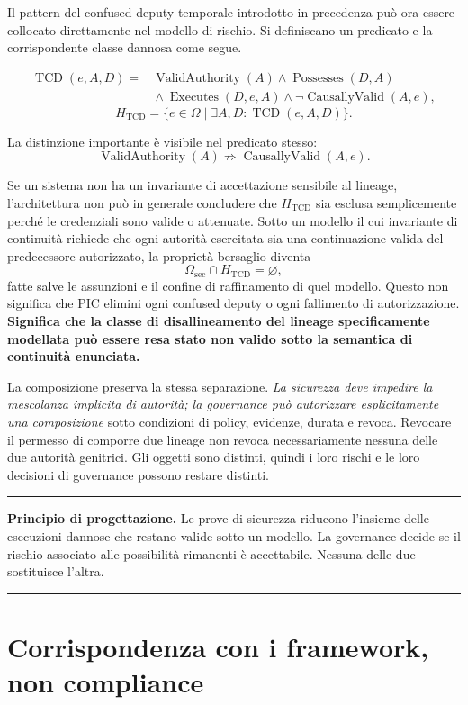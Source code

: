 \documentclass[10pt,oneside,openany]{book}
\newcommand{\principle}[1]{%
  \vspace{4pt}
  \noindent\begin{minipage}{\linewidth}
  \hrule\vspace{5pt}
  \small\sffamily\raggedright\textbf{Principio di progettazione.} #1
  \vspace{5pt}\hrule
  \end{minipage}\vspace{4pt}
}
\begin{document}
Il pattern del confused deputy temporale introdotto in precedenza può ora essere collocato direttamente nel modello di rischio. Si definiscano un predicato e la corrispondente classe dannosa come segue.
\begin{formulabox}
\[
\begin{aligned}
\operatorname{TCD}(e,A,D)={}&\operatorname{ValidAuthority}(A)\land\operatorname{Possesses}(D,A)\\
&{}\land\operatorname{Executes}(D,e,A)\land\neg\operatorname{CausallyValid}(A,e),
\end{aligned}
\]
\[
H_{\mathrm{TCD}}=\{e\in\Omega\mid\exists A,D:\operatorname{TCD}(e,A,D)\}.
\]
\end{formulabox}
La distinzione importante è visibile nel predicato stesso:
\[
\operatorname{ValidAuthority}(A)\not\Rightarrow\operatorname{CausallyValid}(A,e).
\]

Se un sistema non ha un invariante di accettazione sensibile al lineage, l'architettura non può in generale concludere che $H_{\mathrm{TCD}}$ sia esclusa semplicemente perché le credenziali sono valide o attenuate. Sotto un modello il cui invariante di continuità richiede che ogni autorità esercitata sia una continuazione valida del predecessore autorizzato, la proprietà bersaglio diventa
\[
\Omega_{\mathrm{sec}}\cap H_{\mathrm{TCD}}=\varnothing,
\]
fatte salve le assunzioni e il confine di raffinamento di quel modello. Questo non significa che PIC elimini ogni confused deputy o ogni fallimento di autorizzazione. \textbf{Significa che la classe di disallineamento del lineage specificamente modellata può essere resa stato non valido sotto la semantica di continuità enunciata.}

La composizione preserva la stessa separazione. \emph{La sicurezza deve impedire la mescolanza implicita di autorità; la governance può autorizzare esplicitamente una composizione} sotto condizioni di policy, evidenze, durata e revoca. Revocare il permesso di comporre due lineage non revoca necessariamente nessuna delle due autorità genitrici. Gli oggetti sono distinti, quindi i loro rischi e le loro decisioni di governance possono restare distinti.

\principle{Le prove di sicurezza riducono l'insieme delle esecuzioni dannose che restano valide sotto un modello. La governance decide se il rischio associato alle possibilità rimanenti è accettabile. Nessuna delle due sostituisce l'altra.}

\section{Corrispondenza con i framework, non compliance}
\end{document}
